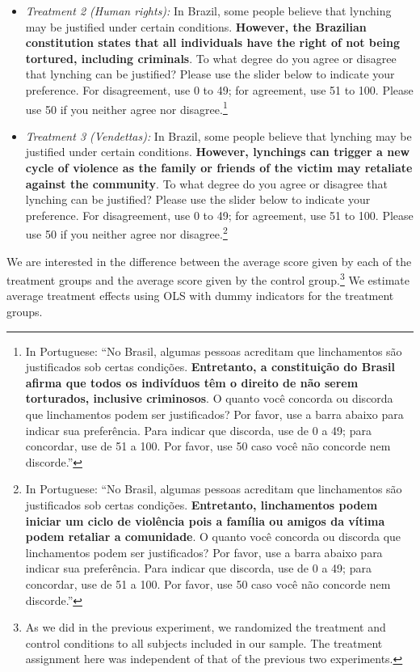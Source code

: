 \documentclass[12pt,a4paper]{article}
\providecommand{\tightlist}{%
   \setlength{\itemsep}{0pt}\setlength{\parskip}{0pt}}
\begin{document}
\begin{itemize}
\tightlist
\item
  \emph{Treatment 2 (Human rights):} In Brazil, some people believe that lynching may be justified under certain conditions. \textbf{However, the Brazilian constitution states that all individuals have the right of not being tortured, including criminals}. To what degree do you agree or disagree that lynching can be justified? Please use the slider below to indicate your preference. For disagreement, use 0 to 49; for agreement, use 51 to 100. Please use 50 if you neither agree nor disagree.\footnote{In Portuguese: ``No Brasil, algumas pessoas acreditam que linchamentos são justificados sob certas condições. \textbf{Entretanto, a constituição do Brasil afirma que todos os indivíduos têm o direito de não serem torturados, inclusive criminosos}. O quanto você concorda ou discorda que linchamentos podem ser justificados? Por favor, use a barra abaixo para indicar sua preferência. Para indicar que discorda, use de 0 a 49; para concordar, use de 51 a 100. Por favor, use 50 caso você não concorde nem discorde.''}
\end{itemize}

\begin{itemize}
\tightlist
\item
  \emph{Treatment 3 (Vendettas):} In Brazil, some people believe that lynching may be justified under certain conditions. \textbf{However, lynchings can trigger a new cycle of violence as the family or friends of the victim may retaliate against the community}. To what degree do you agree or disagree that lynching can be justified? Please use the slider below to indicate your preference. For disagreement, use 0 to 49; for agreement, use 51 to 100. Please use 50 if you neither agree nor disagree.\footnote{In Portuguese: ``No Brasil, algumas pessoas acreditam que linchamentos são justificados sob certas condições. \textbf{Entretanto, linchamentos podem iniciar um ciclo de violência pois a família ou amigos da vítima podem retaliar a comunidade}. O quanto você concorda ou discorda que linchamentos podem ser justificados? Por favor, use a barra abaixo para indicar sua preferência. Para indicar que discorda, use de 0 a 49; para concordar, use de 51 a 100. Por favor, use 50 caso você não concorde nem discorde.''}
\end{itemize}

We are interested in the difference between the average score given by each of the treatment groups and the average score given by the control group.\footnote{As we did in the previous experiment, we randomized the treatment and control conditions to all subjects included in our sample. The treatment assignment here was independent of that of the previous two experiments.} We estimate average treatment effects using OLS with dummy indicators for the treatment groups.
\end{document}
